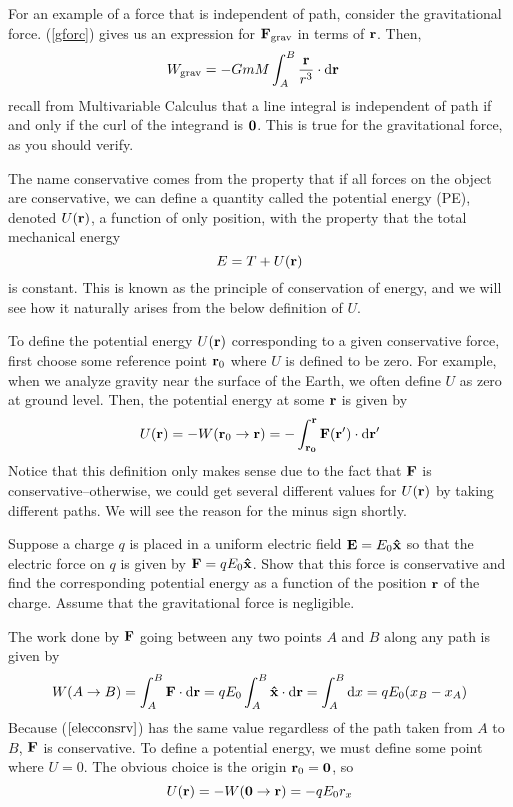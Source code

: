 For an example of a force that is independent of path, consider the gravitational force. (\ref{gforc}) gives us an expression for $\mathbf{F}_\text{grav}$ in terms of $\mathbf{r}$. Then,
\begin{align*}
    W_\text{grav} &= -GmM \int_A^B \frac{\mathbf{r}}{r^3}\cdot \dd \mathbf{r}
\end{align*}
recall from Multivariable Calculus that a line integral is independent of path if and only if the curl of the integrand is $\mathbf{0}$. This is true for the gravitational force, as you should verify. 

The name conservative comes from the property that if all forces on the object are conservative, we can define a quantity called the potential energy (PE), denoted $U(\mathbf{r})$, a function of only position, with the property that the total mechanical energy
\[ E = T + U(\mathbf{r}) \]
is constant. This is known as the principle of conservation of energy, and we will see  how it naturally arises from the below definition of $U$. 

To define the potential energy $U(\mathbf{r})$ corresponding to a given conservative force, first choose some reference point $\mathbf{r}_0$ where $U$ is defined to be zero. For example, when we analyze gravity near the surface of the Earth, we often define $U$ as zero at ground level. Then, the potential energy at some $\mathbf{r}$ is given by
\[ U(\mathbf{r}) = -W(\mathbf{r}_0\to\mathbf{r}) = -\int_{\mathbf{r_0}}^{\mathbf{r}} \mathbf{F}(\mathbf{r}')\cdot \dd \mathbf{r}' \]
Notice that this definition only makes sense due to the fact that $\mathbf{F}$ is conservative--otherwise, we could get several different values for $U(\mathbf{r})$ by taking different paths. We will see the reason for the minus sign shortly. 
\begin{example}
    Suppose a charge $q$ is placed in a uniform electric field $\mathbf{E} = E_0\mathbf{\hat{x}}$ so that the electric force on $q$ is given by $\mathbf{F} = qE_0\mathbf{\hat{x}}$. Show that this force is conservative and find the corresponding potential energy as a function of the position $\mathbf{r}$ of the charge. Assume that the gravitational force is negligible.

    The work done by $\mathbf{F}$ going between any two points $A$ and $B$ along any path is given by
    \begin{equation} \label{elecconsrv}
        W(A\to B) = \int_A^B \mathbf{F} \cdot \dd \mathbf{r} = qE_0 \int_A^B \mathbf{\hat{x}} \cdot \dd \mathbf{r} = \int_A^B \dd x = qE_0(x_B - x_A)
    \end{equation}
    Because ($\ref{elecconsrv}$) has the same value regardless of the path taken from $A$ to $B$, $\mathbf{F}$ is conservative. To define a potential energy, we must define some point where $U=0$. The obvious choice is the origin $\mathbf{r}_0 = \mathbf{0}$, so
    \[ U(\mathbf{r}) = -W(\mathbf{0} \to \mathbf{r}) = -qE_0 r_x\]
\end{example}

